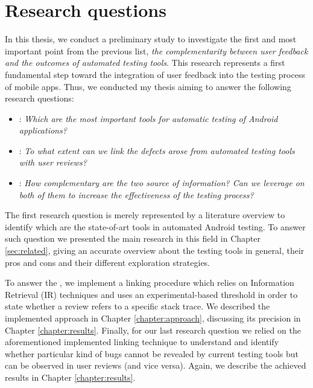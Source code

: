 \section{Research questions}
\label{section:rqs}
In this thesis, we conduct a preliminary study to investigate the first and most important point from the previous list, \ie \textit{the complementarity between user feedback and the outcomes of automated testing tools}. This research represents a first fundamental step toward the integration of user feedback into the testing process of mobile apps. Thus, we conducted my thesis aiming to answer the following research questions:

\begin{itemize}
	\item {}: \textit{Which are the most important tools for automatic testing of Android applications?} %
	\item {}: \textit{To what extent can we link the defects arose from automated testing tools with user reviews?}  
	\item {}: \textit{How complementary are the two source of information? Can we leverage on both of them to increase the effectiveness of the testing process?}
\end{itemize}
The first research question is merely represented by a literature overview to identify which are the state-of-art tools in automated Android testing. To answer such question we presented the main research in this field in Chapter \ref{sec:related}, giving an accurate overview about the testing tools in general, their pros and cons and their different exploration strategies. 

To answer the , we implement a linking procedure which relies on Information Retrieval (IR) techniques and uses an experimental-based threshold in order to state whether a review refers to a specific stack trace. We described the implemented approach in Chapter \ref{chapter:approach}, discussing its precision in Chapter \ref{chapter:results}.
Finally, for our last research question we relied on the aforementioned implemented linking technique to understand and identify whether particular kind of bugs cannot be revealed by current testing tools but can be observed in user reviews (and vice versa). Again, we describe the achieved results in Chapter \ref{chapter:results}.